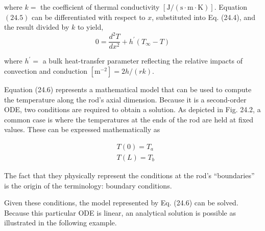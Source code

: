 \documentclass[../main.tex]{subfiles}
\begin{document}
\noindent where $k=$ the coefficient of thermal conductivity $[\mathrm{J} /(\mathrm{s} \cdot \mathrm{m} \cdot \mathrm{K})]$. Equation $(24.5)$ can be differentiated with respect to $x$, substituted into Eq. (24.4), and the result divided by $k$ to yield,
\begin{equation}
    \tag{24.6}
    0=\frac{d^{2} T}{d x^{2}}+h^{\prime}\left(T_{\infty}-T\right)
\end{equation}

\noindent where $h^{\prime}=$ a bulk heat-transfer parameter reflecting the relative impacts of convection and conduction $\left[\mathrm{m}^{-2}\right]=2 h /(r k)$.

Equation (24.6) represents a mathematical model that can be used to compute the temperature along the rod's axial dimension. Because it is a second-order ODE, two conditions are required to obtain a solution. As depicted in Fig. 24.2, a common case is where the temperatures at the ends of the rod are held at fixed values. These can be expressed mathematically as

\begin{equation} \nonumber
    \begin{aligned}
        &T(0)=T_a\\
        &T(L)=T_b
    \end{aligned}
\end{equation}

\noindent The fact that they physically represent the conditions at the rod's ``boundaries'' is the origin of the terminology: boundary conditions.

Given these conditions, the model represented by Eq. (24.6) can be solved. Because
this particular ODE is linear, an analytical solution is possible as illustrated in the following example.
\end{document}
